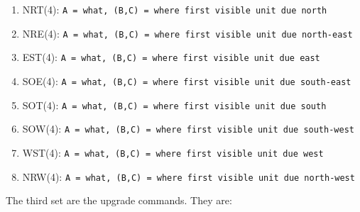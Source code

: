 \documentclass{article}
\begin{document}
\begin{enumerate}[noitemsep]
    \item NRT(4): \texttt{A = what, (B,C) = where first visible unit due north}
    \item NRE(4): \texttt{A = what, (B,C) = where first visible unit due
        north-east}
    \item EST(4): \texttt{A = what, (B,C) = where first visible unit due east}
    \item SOE(4): \texttt{A = what, (B,C) = where first visible unit due
        south-east}
    \item SOT(4): \texttt{A = what, (B,C) = where first visible unit due south}
    \item SOW(4): \texttt{A = what, (B,C) = where first visible unit due
        south-west}
    \item WST(4): \texttt{A = what, (B,C) = where first visible unit due west}
    \item NRW(4): \texttt{A = what, (B,C) = where first visible unit due
        north-west}
\end{enumerate}

The third set are the upgrade commands. They are:
\end{document}
